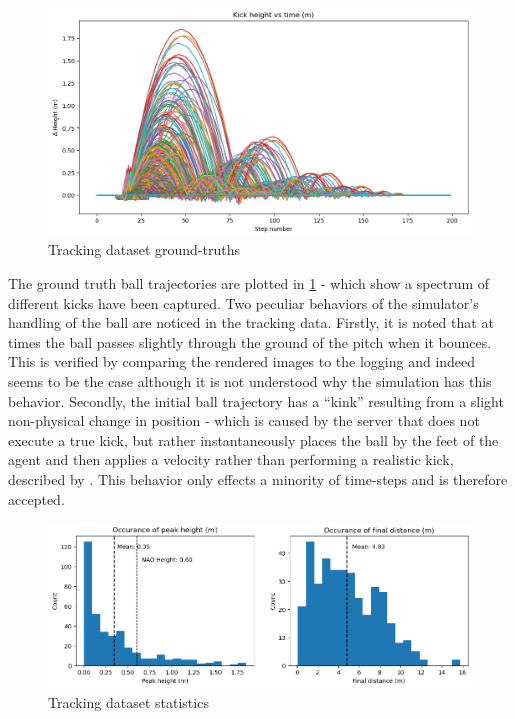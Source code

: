 \documentclass[a4paper,twoside,12pt]{report}
\begin{document}
\begin{figure}[h!]
\begin{center}
\includegraphics[width=14cm]{images/plotkicks.png}
\caption{Tracking dataset ground-truths}
\label{fig:plotkicks}
\end{center}
\end{figure}

The ground truth ball trajectories are plotted in \ref{fig:plotkicks} - which show a spectrum of different kicks have been captured. Two peculiar behaviors of the simulator's handling of the ball are noticed in the tracking data. Firstly, it is noted that at times the ball passes slightly through the ground of the pitch when it bounces. This is verified by comparing the rendered images to the logging and indeed seems to be the case although it is not understood why the simulation has this behavior. Secondly, the initial ball trajectory has a ``kink'' resulting from a slight non-physical change in position - which is caused by the server that does not execute a true kick, but rather instantaneously places the ball by the feet of the agent and then applies a velocity rather than performing a realistic kick, described by \cite{fatproxy}. This behavior only effects a minority of time-steps and is therefore accepted.

\begin{figure}[h!]
\begin{center}
\includegraphics[width=16cm]{images/trackingplot.png}
\caption{Tracking dataset statistics}
\label{fig:trackplot}
\end{center}
\end{figure}
\end{document}

